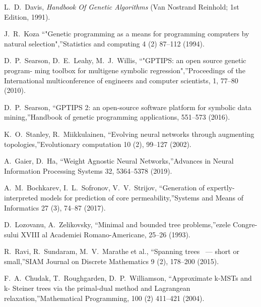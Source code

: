\documentclass[11pt, tightenlines, twoside, onecolumn, nofloats, nobibnotes, nofootinbib, superscriptaddress, noshowpacks, centertags]{revtex4}
\begin{document}
\begin{thebibliography}{99}
L.~D.~Davis, \emph{Handbook Of Genetic Algorithms} (Van Nostrand Reinhold; 1st Edition, 1991).

J.~R.~Koza \textquotedblleft "Genetic programming as a means for programming computers by natural selection",\textquotedblright Statistics and computing 4 (2) 87--112 (1994).
  
D.~P.~Searson, D.~E.~Leahy, M.~J.~Willis, \textquotedblleft "GPTIPS: an open source genetic program- ming toolbox for multigene symbolic regression",\textquotedblright Proceedings of the International multiconference of engineers and computer scientists, 1, 77--80 (2010).

D.~P.~Searson, \textquotedblleft GPTIPS 2: an open-source software platform for symbolic data mining,\textquotedblright Handbook of genetic programming applications, 551--573 (2016).

K.~O.~Stanley, R.~Miikkulainen, \textquotedblleft Evolving neural networks through augmenting topologies,\textquotedblright Evolutionary computation 10 (2), 99--127 (2002).

A.~Gaier, D.~Ha, \textquotedblleft Weight Agnostic Neural Networks,\textquotedblright Advances in Neural Information Processing Systems 32, 5364--5378 (2019).

A.~M.~Bochkarev, I.~L.~Sofronov, V.~V.~Strijov, \textquotedblleft Generation of expertly-interpreted models for prediction of core permeability,\textquotedblright Systems and Means of Informatics 27 (3), 74--87 (2017).

D.~Lozovanu, A.~Zelikovsky, \textquotedblleft Minimal and bounded tree problems,\textquotedblright ezele Congre- sului XVIII al Academiei Romano-Americane,  25--26 (1993).

R.~Ravi, R.~Sundaram, M.~V.~Marathe et al., \textquotedblleft Spanning trees ~--- short or small,\textquotedblright SIAM Journal on Discrete Mathematics 9 (2), 178--200 (2015).

F.~A.~Chudak, T.~Roughgarden, D.~P.~Williamson, \textquotedblleft Approximate k-MSTs and k- Steiner trees via the primal-dual method and Lagrangean relaxation,\textquotedblright Mathematical Programming, 100 (2) 411--421 (2004).


\end{thebibliography}
\end{document}

